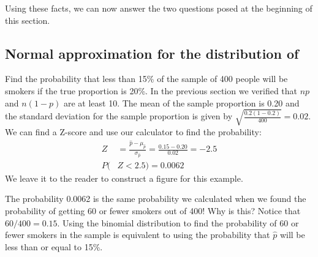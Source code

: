 Using these facts, we can now answer the two questions posed at the beginning of this section.



\subsection[Normal approximation for the distribution of $\hat{p}$]{Normal approximation for the distribution of }

\begin{examplewrap}
\begin{nexample}{Find the probability that less than 15\% of the sample of 400 people will be smokers if the true proportion is 20\%.}
In the previous section we verified that $np$ and $n(1-p)$ are at least 10. The mean of the sample proportion is 0.20 and the standard deviation for the sample proportion is given by $\sqrt{\frac{0.2(1-0.2)}{400}}=0.02$. We can find a Z-score and use our calculator to find the probability:
\begin{align*}
Z &= \frac{\hat{p} - \mu_{\hat{p}}}{\sigma_{\hat{p}}} = \frac{0.15 - 0.20}{0.02} = -2.5 \\
P(&Z < 2.5) = 0.0062
\end{align*}
We leave it to the reader to construct a figure for this example.
\label{smokers}
\end{nexample}
\end{examplewrap}


\begin{examplewrap}
\begin{nexample}{The probability 0.0062 is the same probability we calculated when we found the probability of getting 60 or fewer smokers out of 400! Why is this?}
Notice that $60/400=0.15$. Using the binomial distribution to find the probability of 60 or fewer smokers in the sample is equivalent to using the probability that $\hat{p}$ will be less than or equal to 15\%.
\end{nexample}
\end{examplewrap}

